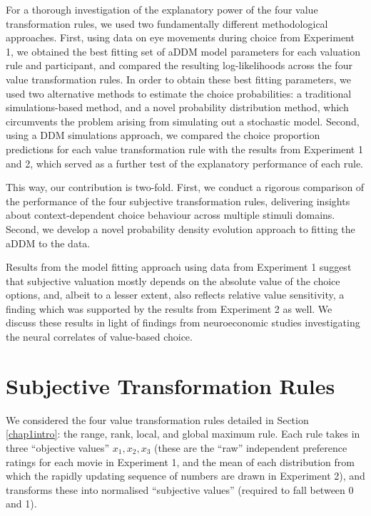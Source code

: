 \documentclass[11pt,a4paper]{article}
\begin{document}
For a thorough investigation of the explanatory power of the four value transformation rules, we used two fundamentally different methodological approaches. First, using data on eye movements during choice from Experiment 1, we obtained the best fitting set of aDDM model parameters for each valuation rule and participant, and compared the resulting log-likelihoods across the four value transformation rules. In order to obtain these best fitting parameters, we used two alternative methods to estimate the choice probabilities: a traditional simulations-based method, and a novel probability distribution method, which circumvents the problem arising from simulating out a stochastic model. Second, using a DDM simulations approach, we compared the choice proportion predictions for each value transformation rule with the results from Experiment 1 and 2, which served as a further test of the explanatory performance of each rule. 

This way, our contribution is two-fold. First, we conduct a rigorous comparison of the performance of the four subjective transformation rules, delivering insights about context-dependent choice behaviour across multiple stimuli domains. Second, we develop a novel probability density evolution approach to fitting the aDDM to the data. 

Results from the model fitting approach using data from Experiment 1 suggest that subjective valuation mostly depends on the absolute value of the choice options, and, albeit to a lesser extent, also reflects  relative value sensitivity, a finding which was supported by the results from Experiment 2  as well. We discuss these results in light of findings from neuroeconomic studies investigating the neural correlates of value-based choice.

\section{Subjective Transformation Rules} \label{chap1subjtrexplained}

We considered the four value transformation rules detailed in Section \ref{chap1intro}: the range, rank, local, and global maximum rule. Each rule takes in three “objective values” $x_1, x_2, x_3$  (these are the “raw” independent preference ratings for each movie in Experiment 1, and the mean of each distribution from which the rapidly updating sequence of numbers are drawn in Experiment 2), and transforms these into normalised “subjective values” (required to fall between 0 and 1). 
\end{document}

